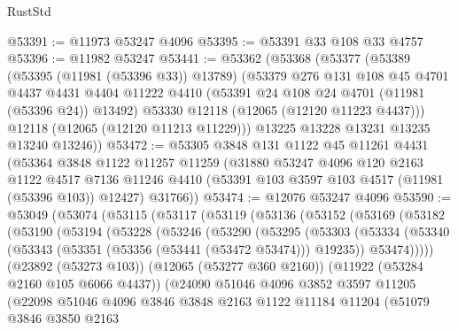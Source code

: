 \begin{lexlean}{RustStd}
\begin{coremodule}
@53391 := @11973 @53247 @4096
@53395 := @53391 @33 @108 @33 @4757
@53396 := @11982 @53247
@53441 := @53362
    (@53368
      (@53377
        (@53389
          (@53395 (@11981 (@53396 @33)) @13789)
          (@53379
            @276
            @131
            @108
            @45
            @4701
            @4437
            @4431
            @4404
            @11222
            @4410
            (@53391 @24 @108 @24 @4701 (@11981 (@53396 @24)) @13492)
            @53330
            @12118
            (@12065 (@12120 @11223 @4437)))
          @12118
          (@12065 (@12120 @11213 @11229)))
        @13225
        @13228
        @13231
        @13235
        @13240
        @13246))
@53472 := @53305
    @3848
    @131
    @1122
    @45
    @11261
    @4431
    (@53364
      @3848
      @1122
      @11257
      @11259
      (@31880
        @53247
        @4096
        @120
        @2163
        @1122
        @4517
        @7136
        @11246
        @4410
        (@53391 @103 @3597 @103 @4517 (@11981 (@53396 @103)) @12427)
        @31766))
@53474 := @12076 @53247 @4096
@53590 := @53049
    (@53074
      (@53115
        (@53117
          (@53119
            (@53136
              (@53152
                (@53169
                  (@53182
                    (@53190
                      (@53194
                        (@53228
                          (@53246
                            (@53290
                              (@53295
                                (@53303
                                  (@53334
                                    (@53340
                                      (@53343 (@53351 (@53356 (@53441 (@53472 @53474))) @19235))
                                      @53474)))))
                            (@23892 (@53273 @103))
                            (@12065 (@53277 @360 @2160))
                            (@11922 (@53284 @2160 @105 @6066 @4437))
                            (@24090
                              @51046
                              @4096
                              @3852
                              @3597
                              @11205
                              (@22098
                                @51046
                                @4096
                                @3846
                                @3848
                                @2163
                                @1122
                                @11184
                                @11204
                                (@51079
                                  @3846
                                  @3850
                                  @2163

\end{coremodule}
\end{lexlean}
